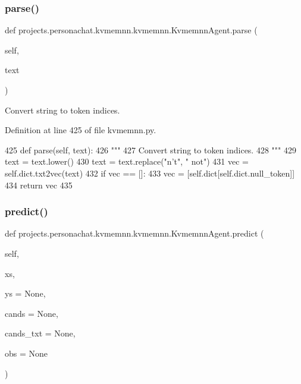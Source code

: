 \subsubsection{\texorpdfstring{parse()}{parse()}}
{\footnotesize\ttfamily def projects.\+personachat.\+kvmemnn.\+kvmemnn.\+Kvmemnn\+Agent.\+parse (\begin{DoxyParamCaption}\item[{}]{self,  }\item[{}]{text }\end{DoxyParamCaption})}

\begin{DoxyVerb}Convert string to token indices.
\end{DoxyVerb}
 

Definition at line 425 of file kvmemnn.\+py.


\begin{DoxyCode}
425     \textcolor{keyword}{def }parse(self, text):
426         \textcolor{stringliteral}{"""}
427 \textcolor{stringliteral}{        Convert string to token indices.}
428 \textcolor{stringliteral}{        """}
429         text = text.lower()
430         text = text.replace(\textcolor{stringliteral}{"n't"}, \textcolor{stringliteral}{" not"})
431         vec = self.dict.txt2vec(text)
432         \textcolor{keywordflow}{if} vec == []:
433             vec = [self.dict[self.dict.null\_token]]
434         \textcolor{keywordflow}{return} vec
435 
\end{DoxyCode}
\mbox{\label{classprojects_1_1personachat_1_1kvmemnn_1_1kvmemnn_1_1KvmemnnAgent_a40a3b9f66a331d05394869c709d4a02a}} 
\subsubsection{\texorpdfstring{predict()}{predict()}}
{\footnotesize\ttfamily def projects.\+personachat.\+kvmemnn.\+kvmemnn.\+Kvmemnn\+Agent.\+predict (\begin{DoxyParamCaption}\item[{}]{self,  }\item[{}]{xs,  }\item[{}]{ys = {\ttfamily None},  }\item[{}]{cands = {\ttfamily None},  }\item[{}]{cands\+\_\+txt = {\ttfamily None},  }\item[{}]{obs = {\ttfamily None} }\end{DoxyParamCaption})}

